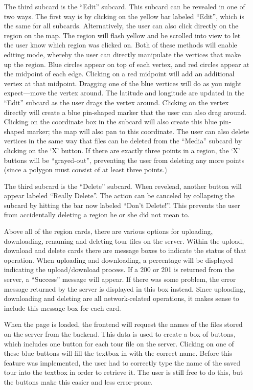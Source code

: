 \documentclass[a4paper, 10pt, american, titlepage]{article}
\begin{document}
The third subcard is the ``Edit'' subcard. This subcard can be revealed in one
of two ways. The first way is by clicking on the yellow bar labeled ``Edit'',
which is the same for all subcards. Alternatively, the user can also click
directly on the region on the map. The region will flash yellow and be scrolled
into view to let the user know which region was clicked on. Both of these
methods will enable editing mode, whereby the user can directly manipulate the
vertices that make up the region. Blue circles appear on top of each vertex,
and red circles appear at the midpoint of each edge. Clicking on a red midpoint
will add an additional vertex at that midpoint. Dragging one of the blue
vertices will do as you might expect---move the vertex around. The latitude and
longitude are updated in the ``Edit'' subcard as the user drags the vertex
around. Clicking on the vertex directly will create a blue pin-shaped marker
that the user can also drag around. Clicking on the coordinate box in the
subcard will also create this blue pin-shaped marker; the map will also pan to
this coordinate. The user can also delete vertices in the same way that files
can be deleted from the ``Media'' subcard by clicking on the `X' button. If there
are exactly three points in a region, the `X' buttons will be ``grayed-out'',
preventing the user from deleting any more points (since a polygon must consist
of at least three points.)

The third subcard is the ``Delete'' subcard. When revelead, another button will
appear labeled ``Really Delete''. The action can be canceled by collapsing the
subcard by hitting the bar now labeled ``Don't Delete!''. This prevents the user
from accidentally deleting a region he or she did not mean to.

Above all of the region cards, there are various options for uploading,
downloading, renaming and deleting tour files on the server. Within the upload,
download and delete cards there are message boxes to indicate the status of
that operation. When uploading and downloading, a percentage will be displayed
indicating the upload/download process. If a 200 or 201 is returned from the
server, a ``Success'' message will appear. If there was some problem, the error
message returned by the server is displayed in this box instead. Since
uploading, downloading and deleting are all network-related operations, it
makes sense to include this message box for each card.

When the page is loaded, the frontend will request the names of the files
stored on the server from the backend. This data is used to create a box of
buttons, which includes one button for each tour file on the server. Clicking on
one of these blue buttons will fill the textbox in with the correct name. Before
this feature was implemented, the user had to correctly type the name of the
saved tour into the textbox in order to retrieve it. The user is still free to
do this, but the buttons make this easier and less error-prone.
\end{document}
